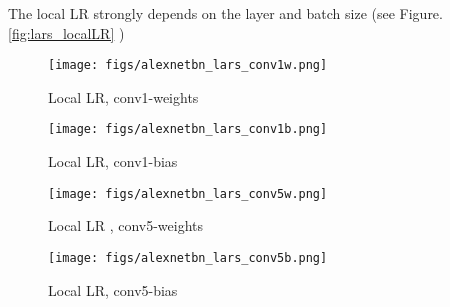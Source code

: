 \documentclass{article} %
\begin{document}
The local LR strongly depends on the layer and batch size (see Figure. \ref{fig:lars_localLR} )
 \begin{figure*}[htb!]
    \begin{subfigure}[b]{0.5\textwidth}
        \centering
        \texttt{[image: figs/alexnetbn\_lars\_conv1w.png]}
        \caption{Local LR, conv1-weights}
    \end{subfigure}%
    \begin{subfigure}[b]{0.5\textwidth}
        \centering
        \texttt{[image: figs/alexnetbn\_lars\_conv1b.png]}
        \caption{Local LR, conv1-bias}
    \end{subfigure}
    \begin{subfigure}[b]{0.5\textwidth}
        \centering
        \texttt{[image: figs/alexnetbn\_lars\_conv5w.png]}
        \caption{Local LR , conv5-weights}
    \end{subfigure}
    \begin{subfigure}[b]{0.5\textwidth}
        \centering
        \texttt{[image: figs/alexnetbn\_lars\_conv5b.png]}
        \caption{Local LR, conv5-bias}
    \end{subfigure}
    \caption{\label{fig:lars_localLR} LARS: local LR for different layers and batch sizes}
\end{figure*}

\end{document}
